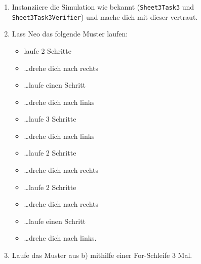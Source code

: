 
\begin{enumerate}
	\item
	Instanziiere die Simulation wie bekannt (\lstinline{Sheet3Task3} und \lstinline{Sheet3Task3Verifier}) und mache dich mit dieser vertraut.
	\item
		Lass Neo das folgende Muster laufen:
		\begin{itemize}
			\item[] laufe 2 Schritte
			\item[] …drehe dich nach rechts
			\item[] …laufe einen Schritt
			\item[] …drehe dich nach links
			\item[] …laufe 3 Schritte
			\item[] …drehe dich nach links
			\item[] …laufe 2 Schritte
			\item[] …drehe dich nach rechts
			\item[] …laufe 2 Schritte
			\item[] …drehe dich nach rechts
			\item[] …laufe einen Schritt
			\item[] …drehe dich nach links.
		\end{itemize}
	\item
		Laufe das Muster aus b) mithilfe einer For-Schleife 3 Mal.
\end{enumerate}


